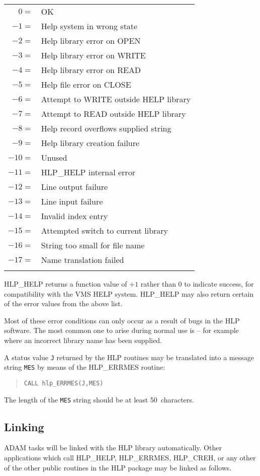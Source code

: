 \begin{tabular}{rl}
\\
   $0=$ & OK \\
  $-1=$ & Help system in wrong state \\
  $-2=$ & Help library error on OPEN \\
  $-3=$ & Help library error on WRITE \\
  $-4=$ & Help library error on READ \\
  $-5=$ & Help file error on CLOSE \\
  $-6=$ & Attempt to WRITE outside HELP library \\
  $-7=$ & Attempt to READ outside HELP library \\
  $-8=$ & Help record overflows supplied string \\
  $-9=$ & Help library creation failure \\
 $-10=$ & Unused \\
 $-11=$ & HLP\_HELP internal error \\
 $-12=$ & Line output failure \\
 $-13=$ & Line input failure \\
 $-14=$ & Invalid index entry \\
 $-15=$ & Attempted switch to current library \\
 $-16=$ & String too small for file name \\
 $-17=$ & Name translation failed \\ \\
\end{tabular}

HLP\_HELP returns a function value of $+1$ rather than 0 to indicate
success, for compatibility with the VMS HELP system.  HLP\_HELP may also
return certain of the error values from the above list.

Most of these error conditions can only occur as a result of
bugs in the HLP software.  The most common one to arise during
normal use is  -- for example where
an incorrect library name has been supplied.

A status value {\tt J} returned by the HLP routines may be translated
into a message string {\tt MES} by means of the HLP\_ERRMES routine:
\begin{verse}
{\tt CALL hlp\_ERRMES(J,MES)}
\end{verse}
The length of the {\tt MES} string should be at least 50~characters.

\subsection{Linking}
ADAM tasks will be linked with the HLP library automatically.
Other applications which call HLP\_HELP, HLP\_ERRMES, HLP\_CREH,
or any other of the other public
routines in the HLP package may be linked as follows.

